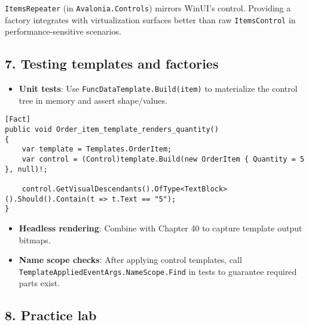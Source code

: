 \passthrough{\lstinline!ItemsRepeater!} (in
\passthrough{\lstinline!Avalonia.Controls!}) mirrors WinUI's control.
Providing a factory integrates with virtualization surfaces better than
raw \passthrough{\lstinline!ItemsControl!} in performance-sensitive
scenarios.

\subsection{7. Testing templates and
factories}\label{testing-templates-and-factories}

\begin{itemize}
\tightlist
\item
  \textbf{Unit tests}: Use
  \passthrough{\lstinline!FuncDataTemplate.Build(item)!} to materialize
  the control tree in memory and assert shape/values.
\end{itemize}

\begin{lstlisting}
[Fact]
public void Order_item_template_renders_quantity()
{
    var template = Templates.OrderItem;
    var control = (Control)template.Build(new OrderItem { Quantity = 5 }, null)!;

    control.GetVisualDescendants().OfType<TextBlock>().Should().Contain(t => t.Text == "5");
}
\end{lstlisting}

\begin{itemize}
\tightlist
\item
  \textbf{Headless rendering}: Combine with Chapter 40 to capture
  template output bitmaps.
\item
  \textbf{Name scope checks}: After applying control templates, call
  \passthrough{\lstinline!TemplateAppliedEventArgs.NameScope.Find!} in
  tests to guarantee required parts exist.
\end{itemize}

\subsection{8. Practice lab}\label{practice-lab-3}

